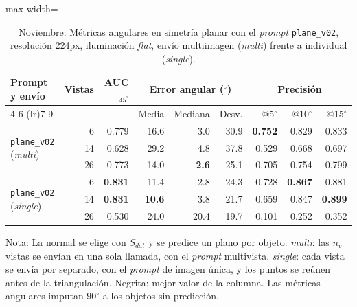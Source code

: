 \begin{table}[htbp]
\centering
\caption{Noviembre: Métricas angulares en simetría planar con el \textit{prompt} \texttt{plane\_v02}, resolución 224px, iluminación \textit{flat}, envío multiimagen (\textit{multi}) frente a individual (\textit{single}).}
\label{tab:nov_plane_v02_modo_envio_angular}
\begin{lrbox}{\tablebox}
\begin{adjustbox}{max width=\textwidth}
\begin{tabular}{lrrrrrrrr}
\toprule
\multirow{2}{*}{Prompt y envío} & \multirow{2}{*}{Vistas} & \multirow{2}{*}{AUC$_{45^\circ}$} & \multicolumn{3}{c}{Error angular ($^\circ$)} & \multicolumn{3}{c}{Precisión} \\
\cmidrule(lr){4-6} \cmidrule(lr){7-9}
 &  &  & Media & Mediana & Desv. & @5$^\circ$ & @10$^\circ$ & @15$^\circ$ \\
\midrule
\multirow{3}{*}{\texttt{plane\_v02} (\textit{multi})} & 6 & 0.779 & 16.6 & 3.0 & 30.9 & \textbf{0.752} & 0.829 & 0.833 \\
 & 14 & 0.628 & 29.2 & 4.8 & 37.8 & 0.529 & 0.668 & 0.697 \\
 & 26 & 0.773 & 14.0 & \textbf{2.6} & 25.1 & 0.705 & 0.754 & 0.799 \\
\midrule
\multirow{3}{*}{\texttt{plane\_v02} (\textit{single})} & 6 & \textbf{0.831} & 11.4 & 2.8 & 24.3 & 0.728 & \textbf{0.867} & 0.881 \\
 & 14 & \textbf{0.831} & \textbf{10.6} & 3.8 & 21.7 & 0.659 & 0.847 & \textbf{0.899} \\
 & 26 & 0.530 & 24.0 & 20.4 & 19.7 & 0.101 & 0.252 & 0.352 \\
\bottomrule
\end{tabular}
\end{adjustbox}
\end{lrbox}
\usebox{\tablebox}

\vspace{1.5ex}
\begin{minipage}{\wd\tablebox}
\footnotesize
Nota: La normal se elige con $S_{dat}$ y se predice un plano por objeto. \textit{multi}: las $n_v$ vistas se envían en una sola llamada, con el \textit{prompt} multivista. \textit{single}: cada vista se envía por separado, con el \textit{prompt} de imagen única, y los puntos se reúnen antes de la triangulación. Negrita: mejor valor de la columna. Las métricas angulares imputan $90^\circ$ a los objetos sin predicción.
\end{minipage}
\end{table}

